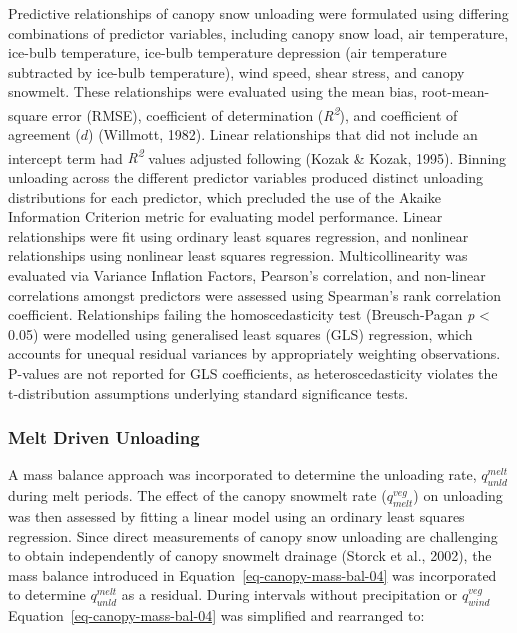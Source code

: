 \documentclass[
  letterpaper,
]{tex/uofsthesis-cs}
\begin{document}
Predictive relationships of canopy snow unloading were formulated using
differing combinations of predictor variables, including canopy snow
load, air temperature, ice-bulb temperature, ice-bulb temperature
depression (air temperature subtracted by ice-bulb temperature), wind
speed, shear stress, and canopy snowmelt. These relationships were
evaluated using the mean bias, root-mean-square error (RMSE),
coefficient of determination (\emph{R\textsuperscript{2}}), and
coefficient of agreement (\(d\)) (Willmott, 1982). Linear relationships
that did not include an intercept term had \emph{R\textsuperscript{2}}
values adjusted following (Kozak \& Kozak, 1995). Binning unloading
across the different predictor variables produced distinct unloading
distributions for each predictor, which precluded the use of the Akaike
Information Criterion metric for evaluating model performance. Linear
relationships were fit using ordinary least squares regression, and
nonlinear relationships using nonlinear least squares regression.
Multicollinearity was evaluated via Variance Inflation Factors,
Pearson's correlation, and non-linear correlations amongst predictors
were assessed using Spearman's rank correlation coefficient.
Relationships failing the homoscedasticity test (Breusch-Pagan \emph{p}
\textless{} 0.05) were modelled using generalised least squares (GLS)
regression, which accounts for unequal residual variances by
appropriately weighting observations. P-values are not reported for GLS
coefficients, as heteroscedasticity violates the t-distribution
assumptions underlying standard significance tests.

\subsubsection{Melt Driven Unloading}\label{melt-driven-unloading}

A mass balance approach was incorporated to determine the unloading
rate, \(q_{unld}^{melt}\) during melt periods. The effect of the canopy
snowmelt rate (\(q_{melt}^{veg}\)) on unloading was then assessed by
fitting a linear model using an ordinary least squares regression. Since
direct measurements of canopy snow unloading are challenging to obtain
independently of canopy snowmelt drainage (Storck et al., 2002), the
mass balance introduced in Equation~\ref{eq-canopy-mass-bal-04} was
incorporated to determine \(q_{unld}^{melt}\) as a residual. During
intervals without precipitation or \(q_{wind}^{veg}\)
Equation~\ref{eq-canopy-mass-bal-04} was simplified and rearranged to:
\end{document}
